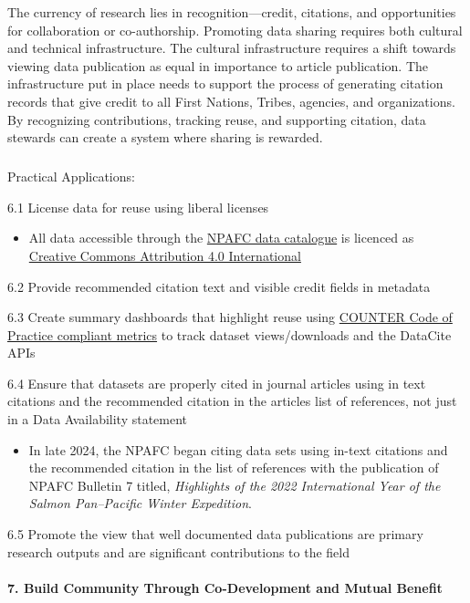 \documentclass[
  letterpaper,
  DIV=11,
  numbers=noendperiod]{scrartcl}
\makeatletter
\let\oldparagraph\paragraph
\renewcommand{\paragraph}{
    \@ifstar
      \xxxParagraphStar
      \xxxParagraphNoStar
  }
\newcommand{\xxxParagraphStar}[1]{\oldparagraph*{#1}\mbox{}}
\newcommand{\xxxParagraphNoStar}[1]{\oldparagraph{#1}\mbox{}}
\let\oldsubparagraph\subparagraph
\renewcommand{\subparagraph}{
    \@ifstar
      \xxxSubParagraphStar
      \xxxSubParagraphNoStar
  }
\newcommand{\xxxSubParagraphStar}[1]{\oldsubparagraph*{#1}\mbox{}}
\newcommand{\xxxSubParagraphNoStar}[1]{\oldsubparagraph{#1}\mbox{}}
\providecommand{\tightlist}{%
  \setlength{\itemsep}{0pt}\setlength{\parskip}{0pt}}\usepackage{longtable,booktabs,array}
\makeatother
\begin{document}
The currency of research lies in recognition---credit, citations, and
opportunities for collaboration or co-authorship. Promoting data sharing
requires both cultural and technical infrastructure. The cultural
infrastructure requires a shift towards viewing data publication as
equal in importance to article publication. The infrastructure put in
place needs to support the process of generating citation records that
give credit to all First Nations, Tribes, agencies, and organizations.
By recognizing contributions, tracking reuse, and supporting citation,
data stewards can create a system where sharing is rewarded.

\subparagraph{Practical Applications:}\label{practical-applications-5}

6.1 License data for reuse using liberal licenses

\begin{itemize}
\tightlist
\item
  All data accessible through the \href{https://data.npafc.org}{NPAFC
  data catalogue} is licenced as~
  \href{https://creativecommons.org/licenses/by/4.0/deed.en}{Creative
  Commons Attribution 4.0 International}
\end{itemize}

6.2 Provide recommended citation text and visible credit fields in
metadata

6.3 Create summary dashboards that highlight reuse using
\href{https://www.countermetrics.org/}{COUNTER Code of Practice
compliant metrics} to track dataset views/downloads and the DataCite
APIs

6.4 Ensure that datasets are properly cited in journal articles using in
text citations and the recommended citation in the articles list of
references, not just in a Data Availability statement

\begin{itemize}
\tightlist
\item
  In late 2024, the NPAFC began citing data sets using in-text citations
  and the recommended citation in the list of references with the
  publication of NPAFC Bulletin 7 titled, \emph{Highlights of the 2022
  International Year of the Salmon Pan--Pacific Winter Expedition}.
\end{itemize}

6.5 Promote the view that well documented data publications are primary
research outputs and are significant contributions to the field

\paragraph{\texorpdfstring{\textbf{7. Build Community Through
Co-Development and Mutual
Benefit}}{7. Build Community Through Co-Development and Mutual Benefit}}\label{build-community-through-co-development-and-mutual-benefit}
\end{document}
